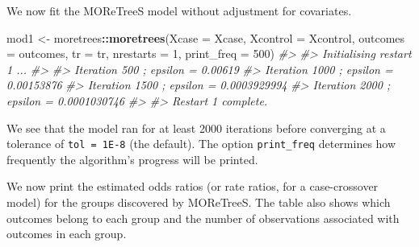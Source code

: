 \documentclass[]{article}
\newenvironment{Shaded}{\begin{snugshade}}{\end{snugshade}}
\newcommand{\CommentTok}[1]{\textcolor[rgb]{0.56,0.35,0.01}{\textit{#1}}}
\newcommand{\DataTypeTok}[1]{\textcolor[rgb]{0.13,0.29,0.53}{#1}}
\newcommand{\DecValTok}[1]{\textcolor[rgb]{0.00,0.00,0.81}{#1}}
\newcommand{\KeywordTok}[1]{\textcolor[rgb]{0.13,0.29,0.53}{\textbf{#1}}}
\newcommand{\NormalTok}[1]{#1}
\newcommand{\OperatorTok}[1]{\textcolor[rgb]{0.81,0.36,0.00}{\textbf{#1}}}
\newcommand{\StringTok}[1]{\textcolor[rgb]{0.31,0.60,0.02}{#1}}
\begin{document}
We now fit the MOReTreeS model without adjustment for covariates.

\begin{Shaded}
\begin{Highlighting}[]
\NormalTok{mod1 <-}\StringTok{ }\NormalTok{moretrees}\OperatorTok{::}\KeywordTok{moretrees}\NormalTok{(}\DataTypeTok{Xcase =}\NormalTok{ Xcase, }\DataTypeTok{Xcontrol =}\NormalTok{ Xcontrol,}
                 \DataTypeTok{outcomes =}\NormalTok{ outcomes, }\DataTypeTok{tr =}\NormalTok{ tr,}
                 \DataTypeTok{nrestarts =} \DecValTok{1}\NormalTok{, }\DataTypeTok{print_freq =} \DecValTok{500}\NormalTok{)}
\CommentTok{#> }
\CommentTok{#> Initialising restart 1 ...}
\CommentTok{#> }
\CommentTok{#> Iteration 500 ; epsilon = 0.00619 }
\CommentTok{#> Iteration 1000 ; epsilon = 0.00153876 }
\CommentTok{#> Iteration 1500 ; epsilon = 0.0003929994 }
\CommentTok{#> Iteration 2000 ; epsilon = 0.0001030746 }
\CommentTok{#> }
\CommentTok{#> Restart 1 complete.}
\end{Highlighting}
\end{Shaded}

We see that the model ran for at least 2000 iterations before converging
at a tolerance of \texttt{tol\ =\ 1E-8} (the default). The option
\texttt{print\_freq} determines how frequently the algorithm's progress
will be printed.

We now print the estimated odds ratios (or rate ratios, for a
case-crossover model) for the groups discovered by MOReTreeS. The table
also shows which outcomes belong to each group and the number of
observations associated with outcomes in each group.
\end{document}
